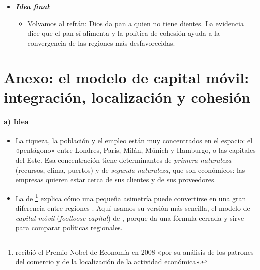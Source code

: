 \documentclass[11pt]{article}
\begin{document}
\begin{itemize}
\begin{itemize}
  \item Llevarla a planes nacionales puede ayudar a gastar, pero solo si no deja fuera a las regiones, que son quienes conocen sus problemas.
  \end{itemize}
\item \textbf{\emph{Idea final}}:
  \begin{itemize}
  \item Volvamos al refrán: Dios da pan a quien no tiene dientes. La evidencia dice que el pan sí alimenta y la política de cohesión ayuda a la convergencia de las regiones más desfavorecidas.
  \end{itemize}
\end{itemize}

\clearpage
\appendix

\section{Anexo: el modelo de capital móvil:\cortetitulo{} integración, localización y cohesión}\label{anexo:capital-movil}


\paragraph{a) Idea}

\begin{itemize}
\item La riqueza, la población y el empleo están muy concentrados en el espacio: el «pentágono» entre Londres, París, Milán, Múnich y Hamburgo, o las capitales del Este. Esa concentración tiene determinantes de \emph{primera naturaleza} (recursos, clima, puertos) y de \emph{segunda naturaleza}, que son económicos: las empresas quieren estar cerca de sus clientes y de sus proveedores.
\item La  de \textcite{Krugman1991Increasing}\footnote{ recibió el Premio Nobel de Economía en 2008 «por su análisis de los patrones del comercio y de la localización de la actividad económica»\nocite{Nobel2008Krugman}.} explica cómo una pequeña asimetría puede convertirse en una gran diferencia entre regiones  . Aquí usamos su versión más sencilla, el modelo de \emph{capital móvil} (\emph{footloose capital}) de \textcite{MartinRogers1995}, porque da una fórmula cerrada y sirve para comparar políticas regionales\nocite{BaldwinEtAl2003Economic}.
\end{itemize}
\end{document}
